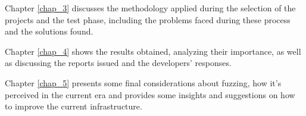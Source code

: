 Chapter \ref{chap_3} discusses the methodology applied during the selection of the projects and the test phase, including the problems faced during these process and the solutions found.

Chapter \ref{chap_4} shows the results obtained, analyzing their importance, as well as discussing the reports issued and the developers' responses.

Chapter \ref{chap_5} presents some final considerations about fuzzing, how it's perceived in the current era and provides some insights and suggestions on how to improve the current infrastructure.
